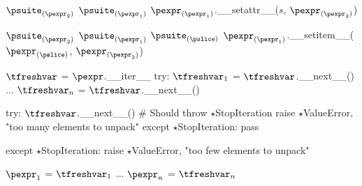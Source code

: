 \documentclass{article}
\begin{document}
\begin{mathpar}
\end{mathpar}

\newsavebox{\attributeAssignmentBox}
\begin{lrbox}{\attributeAssignmentBox}
\begin{python}
$\psuite_{(\pexpr_2)}$
$\psuite_{(\pexpr_1)}$
$\pexpr_{(\pexpr_1)}$.__setattr__($s$, $\pexpr_{(\pexpr_2)}$)
\end{python}
\end{lrbox}

\begin{mathpar}
\end{mathpar}

\newsavebox{\sliceAssignmentBox}
\begin{lrbox}{\sliceAssignmentBox}
\begin{python}
$\psuite_{(\pexpr_2)}$
$\psuite_{(\pexpr_1)}$
$\psuite_{(\pslice)}$
$\pexpr_{(\pexpr_1)}$.__setitem__($\pexpr_{(\pslice)}$, $\pexpr_{(\pexpr_2)}$)
\end{python}
\end{lrbox}

\begin{mathpar}
\end{mathpar}

\begin{mathpar}
\end{mathpar}

\newsavebox{\tupleAssignmentBox}
\begin{lrbox}{\tupleAssignmentBox}
\begin{python}
$\tfreshvar$ = $\pexpr$.__iter__
try:
  $\tfreshvar_1$ = $\tfreshvar$.__next__()
  ...
  $\tfreshvar_n$ = $\tfreshvar$.__next__()

  try:
    $\tfreshvar$.__next__() # Should throw $\star$StopIteration
    raise $\star$ValueError, "too many elements to unpack"
  except $\star$StopIteration:
    pass

except $\star$StopIteration:
  raise $\star$ValueError, "too few elements to unpack"

$\pexpr_1$ = $\tfreshvar_1$
...
$\pexpr_n$ = $\tfreshvar_n$
\end{python}
\end{lrbox}
\end{document}
